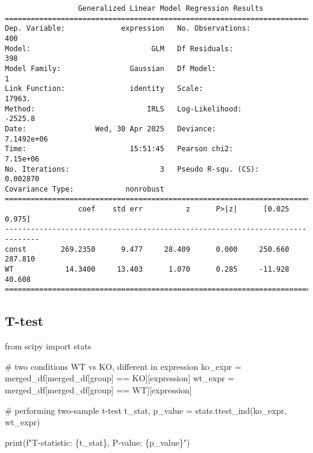 \documentclass[
  letterpaper,
  DIV=11,
  numbers=noendperiod]{scrartcl}
\newenvironment{Shaded}{\begin{snugshade}}{\end{snugshade}}
\newcommand{\BuiltInTok}[1]{\textcolor[rgb]{0.00,0.23,0.31}{#1}}
\newcommand{\CommentTok}[1]{\textcolor[rgb]{0.37,0.37,0.37}{#1}}
\newcommand{\ImportTok}[1]{\textcolor[rgb]{0.00,0.46,0.62}{#1}}
\newcommand{\NormalTok}[1]{\textcolor[rgb]{0.00,0.23,0.31}{#1}}
\newcommand{\OperatorTok}[1]{\textcolor[rgb]{0.37,0.37,0.37}{#1}}
\newcommand{\SpecialCharTok}[1]{\textcolor[rgb]{0.37,0.37,0.37}{#1}}
\newcommand{\SpecialStringTok}[1]{\textcolor[rgb]{0.13,0.47,0.30}{#1}}
\newcommand{\StringTok}[1]{\textcolor[rgb]{0.13,0.47,0.30}{#1}}
\begin{document}
\begin{verbatim}
                 Generalized Linear Model Regression Results                  
==============================================================================
Dep. Variable:             expression   No. Observations:                  400
Model:                            GLM   Df Residuals:                      398
Model Family:                Gaussian   Df Model:                            1
Link Function:               identity   Scale:                          17963.
Method:                          IRLS   Log-Likelihood:                -2525.8
Date:                Wed, 30 Apr 2025   Deviance:                   7.1492e+06
Time:                        15:51:45   Pearson chi2:                 7.15e+06
No. Iterations:                     3   Pseudo R-squ. (CS):           0.002870
Covariance Type:            nonrobust                                         
==============================================================================
                 coef    std err          z      P>|z|      [0.025      0.975]
------------------------------------------------------------------------------
const        269.2350      9.477     28.409      0.000     250.660     287.810
WT            14.3400     13.403      1.070      0.285     -11.928      40.608
==============================================================================
\end{verbatim}

\subsection{T-test}\label{t-test}

\begin{Shaded}
\begin{Highlighting}[]
\ImportTok{from}\NormalTok{ scipy }\ImportTok{import}\NormalTok{ stats}

\CommentTok{\# two conditions WT vs KO, different in expression}
\NormalTok{ko\_expr }\OperatorTok{=}\NormalTok{ merged\_df[merged\_df[}\StringTok{\textquotesingle{}group\textquotesingle{}}\NormalTok{] }\OperatorTok{==} \StringTok{\textquotesingle{}KO\textquotesingle{}}\NormalTok{][}\StringTok{\textquotesingle{}expression\textquotesingle{}}\NormalTok{]}
\NormalTok{wt\_expr }\OperatorTok{=}\NormalTok{ merged\_df[merged\_df[}\StringTok{\textquotesingle{}group\textquotesingle{}}\NormalTok{] }\OperatorTok{==} \StringTok{\textquotesingle{}WT\textquotesingle{}}\NormalTok{][}\StringTok{\textquotesingle{}expression\textquotesingle{}}\NormalTok{]}

\CommentTok{\# performing two{-}sample t{-}test}
\NormalTok{t\_stat, p\_value }\OperatorTok{=}\NormalTok{ stats.ttest\_ind(ko\_expr, wt\_expr)}

\BuiltInTok{print}\NormalTok{(}\SpecialStringTok{f"T{-}statistic: }\SpecialCharTok{\{}\NormalTok{t\_stat}\SpecialCharTok{\}}\SpecialStringTok{, P{-}value: }\SpecialCharTok{\{}\NormalTok{p\_value}\SpecialCharTok{\}}\SpecialStringTok{"}\NormalTok{)}
\end{Highlighting}
\end{Shaded}
\end{document}
